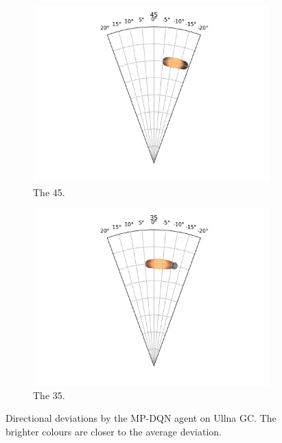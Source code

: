 \documentclass{kththesis}
\begin{document}
\begin{figure}
\begin{subfigure}{0.4\textwidth}
    \centering
    \includegraphics[width=\textwidth]{AgentDirectionChoices/MPDQN_Ullna_Direction_Choices_45.png} 
    \caption{The 45.}
    \label{fig:45_ullna_deviation}
    \end{subfigure}
    \begin{subfigure}{0.4\textwidth}
    \centering
    \includegraphics[width=\textwidth]{AgentDirectionChoices/MPDQN_Ullna_Direction_Choices_35.png} 
    \caption{The 35.}
    \label{fig:35_ullna_deviation}
    \end{subfigure}
    \caption{Directional deviations by the MP-DQN agent on Ullna GC. The brighter colours are closer to the average deviation.}
\end{figure}
\end{document}
